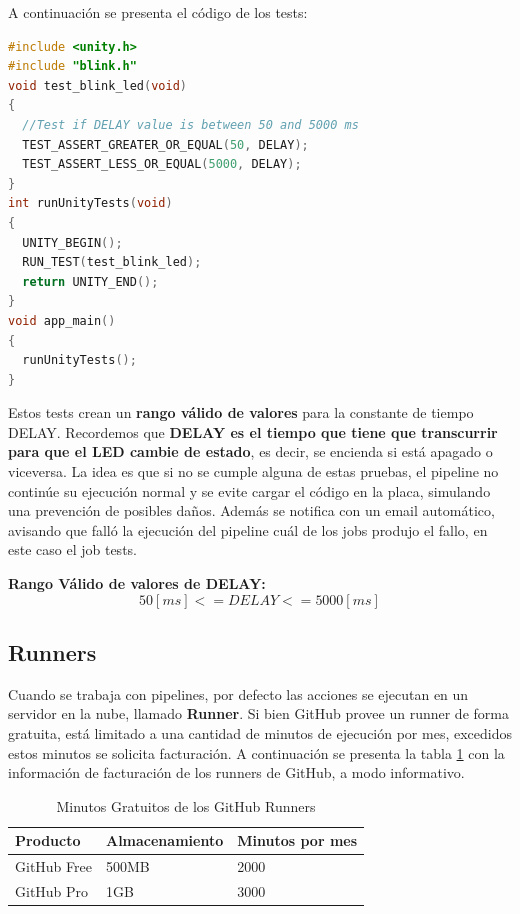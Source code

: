 A continuación se presenta el código de los tests:

\begin{lstlisting}[language=C, caption={UnityTests}, label={cod:unity-tests}, captionpos=b]
#include <unity.h>
#include "blink.h"
void test_blink_led(void)
{
  //Test if DELAY value is between 50 and 5000 ms
  TEST_ASSERT_GREATER_OR_EQUAL(50, DELAY);
  TEST_ASSERT_LESS_OR_EQUAL(5000, DELAY);
}
int runUnityTests(void)
{
  UNITY_BEGIN();
  RUN_TEST(test_blink_led);
  return UNITY_END();
}
void app_main()
{
  runUnityTests();
}
\end{lstlisting}

Estos tests crean un \textbf{rango válido de valores} para la constante de tiempo DELAY. Recordemos que \textbf{DELAY es el tiempo que tiene que transcurrir para que el LED cambie de estado}, es decir, se encienda si está apagado o viceversa. La idea es que si no se cumple alguna de estas pruebas, el pipeline no continúe su ejecución normal y se evite cargar el código en la placa, simulando una prevención de posibles daños. Además se notifica con un email automático, avisando que falló la ejecución del pipeline cuál de los jobs produjo el fallo, en este caso el job tests.

\textbf{Rango Válido de valores de DELAY:}
 $$50[ms] <= DELAY <= 5000[ms]$$



\newpage
\subsection{Runners}

Cuando se trabaja con pipelines, por defecto las acciones se ejecutan en un servidor en la nube, llamado \textbf{Runner}. Si bien GitHub provee un runner de forma gratuita, está limitado a una cantidad de minutos de ejecución por mes, excedidos estos minutos se solicita facturación. A continuación se presenta la tabla \ref{tab:minutos-gratuitos} con la información de facturación de los runners de GitHub, a modo informativo.

\begin{table}[H]
\begin{center}
\begin{tabular}{lll}
\hline
\multicolumn{1}{|l|}{\textbf{Producto}} & \multicolumn{1}{l|}{\textbf{Almacenamiento}} & \multicolumn{1}{l|}{\textbf{Minutos por mes}} \\ \hline
\multicolumn{1}{|l|}{GitHub Free} & \multicolumn{1}{l|}{500MB} & \multicolumn{1}{l|}{2000} \\ \hline
\multicolumn{1}{|l|}{GitHub Pro} & \multicolumn{1}{l|}{1GB} & \multicolumn{1}{l|}{3000} \\ \hline
\end{tabular}
\caption{Minutos Gratuitos de los GitHub Runners}
\label{tab:minutos-gratuitos}
\end{center}
\end{table}

